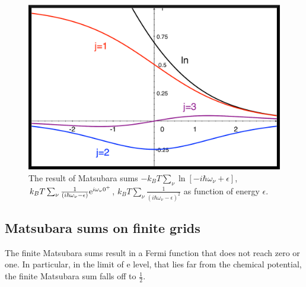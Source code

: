 \documentclass[11pt,a4paper]{report}
\begin{document}
\begin{figure}[h!]
\begin{center}
\includegraphics[width=0.8\linewidth,clip=true]
{Figs/Matsubarasums/matsubarasums1.eps}
\end{center}
\caption{\label{fig:matsubarasums} The result of Matsubara sums
  $-k_BT\sum_\nu\ln[-i\hbar\omega_\nu+\epsilon]$, $k_BT\sum_\nu
  \frac{1}{(i\hbar\omega_\nu-\epsilon)}\mathrm{e}^{i\omega_\nu 0^+}$,
$k_BT\sum_\nu \frac{1}{(i\hbar\omega_\nu-\epsilon)^2}$ as
  function of energy $\epsilon$.}
\end{figure}



\subsection{Matsubara sums on finite grids}
The finite Matsubara sums result in a Fermi function that does not
reach zero or one. In particular, in the limit of e level, that lies
far from the chemical potential, the finite Matsubara sum falls off to
$\frac{1}{2}$.
\end{document}
